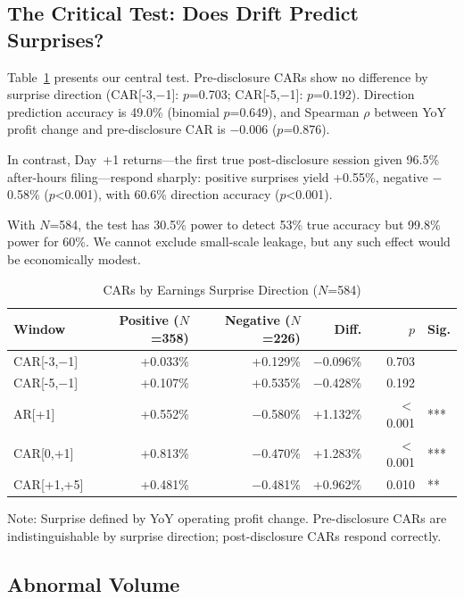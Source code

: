 \documentclass[12pt,a4paper]{article}
\begin{document}
\subsection{The Critical Test: Does Drift Predict Surprises?}

Table~\ref{tab:surprise} presents our central test. Pre-disclosure CARs show no difference by surprise direction (CAR[-3,$-$1]: $p$=0.703; CAR[-5,$-$1]: $p$=0.192). Direction prediction accuracy is 49.0\% (binomial $p$=0.649), and Spearman $\rho$ between YoY profit change and pre-disclosure CAR is $-$0.006 ($p$=0.876).

In contrast, Day~+1 returns---the first true post-disclosure session given 96.5\% after-hours filing---respond sharply: positive surprises yield +0.55\%, negative $-$0.58\% ($p$<0.001), with 60.6\% direction accuracy ($p$<0.001).

With $N$=584, the test has 30.5\% power to detect 53\% true accuracy but 99.8\% power for 60\%. We cannot exclude small-scale leakage, but any such effect would be economically modest.

\begin{table}[H]
\centering
\begin{threeparttable}
\caption{CARs by Earnings Surprise Direction ($N$=584)}
\label{tab:surprise}
\begin{tabular}{lrrrrl}
\toprule
Window & Positive ($N$=358) & Negative ($N$=226) & Diff. & $p$ & Sig. \\
\midrule
CAR[-3,$-$1] & +0.033\% & +0.129\% & $-$0.096\% & 0.703 & \\
CAR[-5,$-$1] & +0.107\% & +0.535\% & $-$0.428\% & 0.192 & \\
\midrule
AR[+1] & +0.552\% & $-$0.580\% & +1.132\% & $<$0.001 & *** \\
CAR[0,+1] & +0.813\% & $-$0.470\% & +1.283\% & $<$0.001 & *** \\
CAR[+1,+5] & +0.481\% & $-$0.481\% & +0.962\% & 0.010 & ** \\
\bottomrule
\end{tabular}
\begin{tablenotes}
\small
\item Note: Surprise defined by YoY operating profit change. Pre-disclosure CARs are indistinguishable by surprise direction; post-disclosure CARs respond correctly.
\end{tablenotes}
\end{threeparttable}
\end{table}

\subsection{Abnormal Volume}
\end{document}
